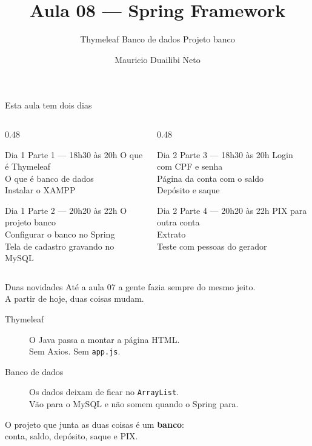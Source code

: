 \documentclass[aspectratio=169,11pt]{beamer}
\title{Aula 08 --- Spring Framework}
\subtitle{Thymeleaf {\textperiodcentered} Banco de dados {\textperiodcentered} Projeto banco}
\author{Mauricio Duailibi Neto}
\institute{Turma Java Entra21}
\date{}
\begin{document}
\begin{frame}
  \titlepage
\end{frame}

\begin{frame}{Esta aula tem dois dias}
  \begin{columns}[T]
    \begin{column}{0.48\textwidth}
      \begin{block}{Dia 1 {\textperiodcentered} Parte 1 --- 18h30 às 20h}
        O que é Thymeleaf\\
        O que é banco de dados\\
        Instalar o XAMPP
      \end{block}
      \begin{block}{Dia 1 {\textperiodcentered} Parte 2 --- 20h20 às 22h}
        O projeto banco\\
        Configurar o banco no Spring\\
        Tela de cadastro gravando no MySQL
      \end{block}
    \end{column}
    \begin{column}{0.48\textwidth}
      \begin{block}{Dia 2 {\textperiodcentered} Parte 3 --- 18h30 às 20h}
        Login com CPF e senha\\
        Página da conta com o saldo\\
        Depósito e saque
      \end{block}
      \begin{block}{Dia 2 {\textperiodcentered} Parte 4 --- 20h20 às 22h}
        PIX para outra conta\\
        Extrato\\
        Teste com pessoas do gerador
      \end{block}
    \end{column}
  \end{columns}
\end{frame}

\begin{frame}{Duas novidades}
  Até a aula 07 a gente fazia sempre do mesmo jeito.\\
  A partir de hoje, duas coisas mudam.

  \vspace{0.6em}
  \begin{description}
    \item[Thymeleaf] O Java passa a montar a página HTML.\\
      Sem Axios. Sem \texttt{app.js}.
    \item[Banco de dados] Os dados deixam de ficar no \texttt{ArrayList}.\\
      Vão para o MySQL e não somem quando o Spring para.
  \end{description}

  \vspace{0.6em}
  O projeto que junta as duas coisas é um \textbf{banco}:\\
  conta, saldo, depósito, saque e PIX.
\end{frame}
\end{document}
